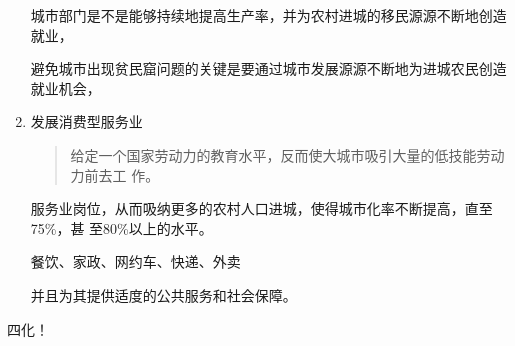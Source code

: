 \begin{enumerate}
  城市部门是不是能够持续地提高生产率，并为农村进城的移民源源不断地创造就业，


  避免城市出现贫民窟问题的关键是要通过城市发展源源不断地为进城农民创造就业机会，

\item 发展消费型服务业

  \begin{quotation}
    给定一个国家劳动力的教育水平，反而使大城市吸引大量的低技能劳动力前去工
    作。
  \end{quotation}


  服务业岗位，从而吸纳更多的农村人口进城，使得城市化率不断提高，直至75\%，甚
  至80\%以上的水平。

  餐饮、家政、网约车、快递、外卖


  并且为其提供适度的公共服务和社会保障。

\end{enumerate}

四化！



















